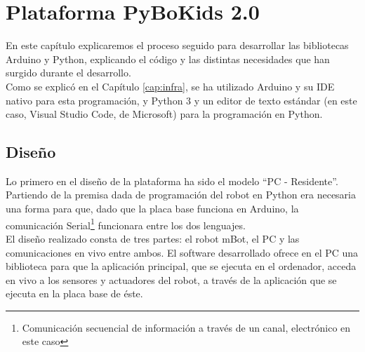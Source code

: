 \chapter{Plataforma PyBoKids 2.0}
\label{cap:PyBoKids}
En este capítulo explicaremos el proceso seguido para desarrollar las bibliotecas Arduino\cite{arduinolenguaje} y Python\cite{PythonRef}, explicando el código y las distintas necesidades que han surgido durante el desarrollo. \\
Como se explicó en el Capítulo \ref{cap:infra}, se ha utilizado Arduino  y su IDE nativo para esta programación, y Python 3 y un editor de texto estándar (en este caso, Visual Studio Code, de Microsoft) para la programación en Python. 

\section{Diseño}\label{sec:diseño}
Lo primero en el diseño de la plataforma ha sido el modelo ``PC - Residente''. Partiendo de la premisa dada de programación del robot en Python era necesaria una forma para que, dado que la placa base funciona en Arduino, la comunicación Serial\footnote{Comunicación secuencial de información a través de un canal, electrónico en este caso} funcionara entre los dos lenguajes. \\
El diseño realizado consta de tres partes: el robot mBot, el PC y las comunicaciones en vivo entre ambos. El software desarrollado ofrece en el PC una biblioteca para que la aplicación principal, que se ejecuta en el ordenador, acceda en vivo a los sensores y actuadores del robot, a través de la aplicación que se ejecuta en la placa base de éste.\\

